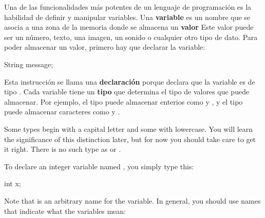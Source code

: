 Una de las funcionalidades más potentes de un lenguaje de programación es la habilidad de definir y manipular variables.
Una {\bf variable} es un nombre que se asocia a una zona de la memoria donde se almacena un {\bf valor}
Este valor puede ser un número, texto, una imagen, un sonido o cualquier otro tipo de dato.
Para poder almacenar un valor, primero hay que declarar la variable:

\begin{code}
String message;
\end{code}


Esta instrucción se llama una {\bf declaración} porque declara que la variable  es de tipo .
Cada variable tiene un {\bf tipo} que determina el tipo de valores que puede almacenar.
Por ejemplo, el tipo  puede almacenar enterios como  y , y el tipo  puede almacenar caracteres como  y .

Some types begin with a capital letter and some with lowercase.
You will learn the significance of this distinction later, but for now you should take care to get it right.
There is no such type as  or .

To declare an integer variable named , you simply type this:

\begin{code}
int x;
\end{code}

Note that  is an arbitrary name for the variable.
In general, you should use names that indicate what the variables mean:

